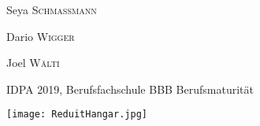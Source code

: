 \begin{titlepage}
            Seya \textsc{Schmassmann} %

            Dario \textsc{Wigger} %
            
			Joel \textsc{Wälti} %
	
	\vfill\vfill\vfill %
	
	{\large IDPA 2019, Berufsfachschule BBB Berufsmaturität} %
	
	
	\vfill\vfill
	\texttt{[image: ReduitHangar.jpg]}\\[1cm] %
	 
	
	\vfill %
	
\end{titlepage}